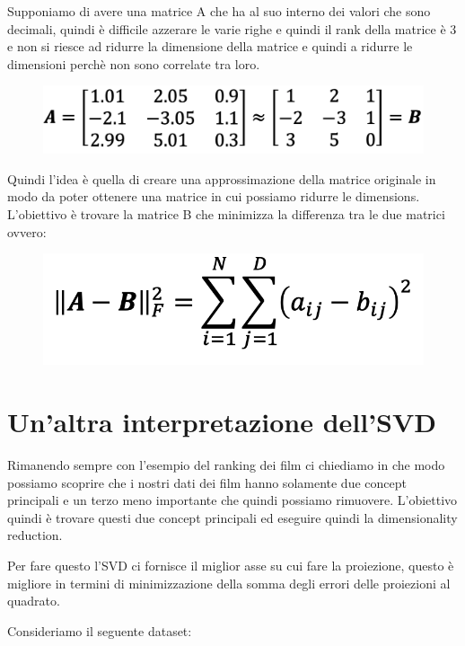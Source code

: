 \documentclass[14pt]{extreport}
\begin{document}
Supponiamo di avere una matrice A che ha al suo interno dei valori che sono decimali, quindi è difficile azzerare le varie righe e quindi il rank della matrice è 3 e non si 
riesce ad ridurre la dimensione della matrice e quindi a ridurre le dimensioni perchè non sono correlate tra loro.

\begin{figure}[H] 
\centering
\includegraphics[width=0.7\linewidth]{501.jpeg}
\end{figure}

Quindi l'idea è quella di creare una approssimazione della matrice originale in modo da poter ottenere una matrice in cui possiamo ridurre le dimensions.
L'obiettivo è trovare la matrice B che minimizza la differenza tra le due matrici ovvero:

\begin{figure}[H] 
\centering
\includegraphics[width=0.7\linewidth]{502.jpeg}
\end{figure}

\section{Un'altra interpretazione dell'SVD}

Rimanendo sempre con l'esempio del ranking dei film ci chiediamo in che modo possiamo scoprire che i nostri dati dei film hanno solamente due concept principali
e un terzo meno importante che quindi possiamo rimuovere. L'obiettivo quindi è trovare questi due concept principali ed eseguire quindi la dimensionality reduction.

Per fare questo l'SVD ci fornisce il miglior asse su cui fare la proiezione, questo è migliore in termini di minimizzazione della 
somma degli errori delle proiezioni al quadrato.

Consideriamo il seguente dataset:
\end{document}

